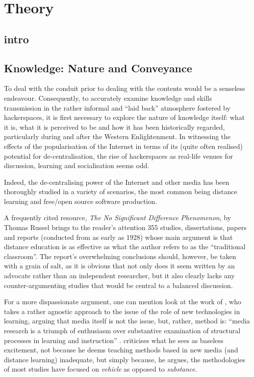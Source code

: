 \section{Theory}
\label{polanyi}

\subsection{intro}

\subsection{Knowledge: Nature and Conveyance}

To deal with the conduit prior to dealing with the contents would be a senseless endeavour. Consequently, to accurately examine knowledge and skills transmission in the rather informal and ``laid back'' atmosphere fostered by hackerspaces, it is first necessary to explore the nature of knowledge itself: what it is, what it is perceived to be and how it has been historically regarded, particularly during and after the Western Enlightenment. In witnessing the effects of the popularisation of the Internet in terms of its (quite often realised) potential for de-centralisation, the rise of hackerspaces as real-life venues for discussion, learning and socialisation seems odd.

Indeed, the de-centralising power of the Internet and other media has been thoroughly studied in a variety of scenarios, the most common being distance learning and free/open source software production.

A frequently cited resource, \textit{The No Significant Difference Phenomenon}, by Thomas Russel \citeyearpar{russel99} brings to the reader's attention 355 studies, dissertations, papers and reports (conducted from as early as 1928) whose main argument is that distance education is as effective as what the author refers to as the ``traditional classroom''. The report's overwhelming conclusions should, however, be taken with a grain of salt, as it is obvious that not only does it seem written by an advocate rather than an independent researcher, but it also clearly lacks any counter-argumenting studies that would be central to a balanced discussion.

For a more dispassionate argument, one can mention look at the work of \citet{clark94}, who takes a rather agnostic approach to the issue of the role of new technologies in learning, arguing that media itself is not the issue, but, rather, method is: ``media research is a triumph of enthusiasm over substantive examination of structural processes in learning and instruction'' \citep[p.27]{clark94}. \citeauthor{clark94} criticises what he sees as baseless excitement, not because he deems teaching methods based in new media (and distance learning) inadequate, but simply because, he argues, the methodologies of most studies have focused on \textit{vehicle} as opposed to \textit{substance}.

